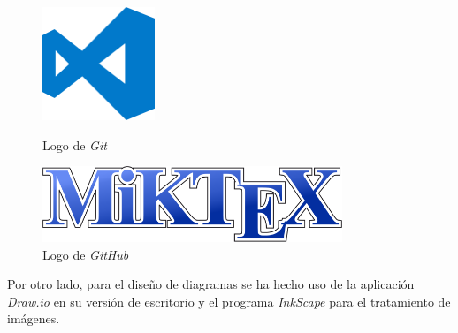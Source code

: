 \begin{figure}[H]
    \centering
    \begin{minipage}{0.38\textwidth}
        \centering
        \includegraphics[width=0.3\textwidth]{Figures/Logo_VSCode.png}
        \caption{Logo de \textit{Git}}
    \end{minipage} \hspace{2cm}
    \begin{minipage}{0.38\textwidth}
        \centering
        \includegraphics[width=0.8\textwidth]{Figures/Logo_MikTex.png}
        \caption{Logo de \textit{GitHub}}
    \end{minipage}
\end{figure}

Por otro lado, para el diseño de diagramas se ha hecho uso de la aplicación \textit{Draw.io} en su versión de 
escritorio y el programa \textit{InkScape} para el tratamiento de imágenes.



